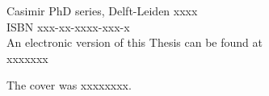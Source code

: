 \begin{titlepage}
\vspace{2\bigskipamount}

\vspace*{\fill}
\noindent
Casimir PhD series, Delft-Leiden xxxx\\
ISBN xxx-xx-xxxx-xxx-x\\

\vspace{5pt}
\noindent
An electronic version of this Thesis can be found at \\ 
xxxxxxx


\vspace*{\fill}
\noindent
The cover was xxxxxxxx.

\clearpage
\thispagestyle{empty}


\end{titlepage}
